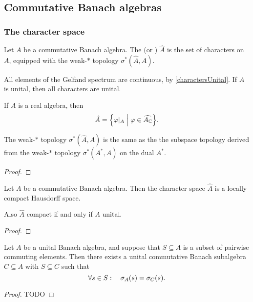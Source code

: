 \subsection{Commutative Banach algebras}
\subsubsection{The character space}
\begin{definition}
Let $A$ be a commutative Banach algebra. The  (or ) $\hat{A}$ is the set of characters on $A$, equipped with the weak-$*$ topology $\sigma^*(\widehat{A}, A)$.
\end{definition}

All elements of the Gelfand spectrum are continuous, by \ref{charactersUnital}. If $A$ is unital, then all characters are unital.

If $A$ is a real algebra, then
\[ \hat{A} = \setbuilder{\varphi|_A}{\varphi\in \widehat{A_\C}}. \]

\begin{lemma}
The weak-$*$ topology $\sigma^*(\widehat{A}, A)$ is the same as the the subspace topology derived from the weak-$*$ topology $\sigma^*(A^*, A)$ on the dual $A^*$.
\end{lemma}
\begin{proof}

\end{proof}

\begin{proposition}
Let $A$ be a commutative Banach algebra. Then the character space $\hat{A}$ is a locally compact Hausdorff space.

Also $\hat{A}$ compact if and only if $A$ unital.
\end{proposition}
\begin{proof}

\end{proof}

\begin{proposition} \label{commutativeSameSpectrum}
Let $A$ be  a  unital  Banach  algebra,  and  suppose  that $S\subseteq A$ is a subset  of  pairwise commuting elements.  Then there exists a unital commutative Banach subalgebra $C\subseteq A$ with $S\subseteq C$ such that
\[ \forall s\in S: \quad \sigma_A(s) = \sigma_C(s). \]
\end{proposition}
\begin{proof}
TODO
\end{proof}

